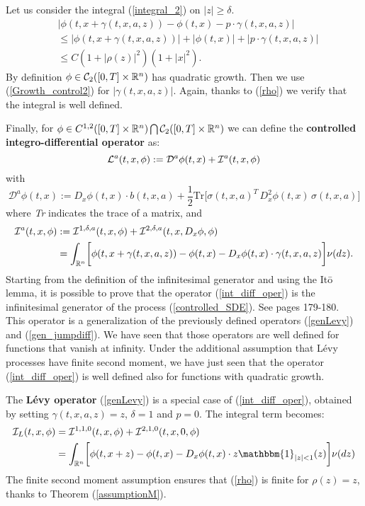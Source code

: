 Let us consider the integral (\ref{integral_2}) on $|z|\geq \delta$. 
\begin{align*}
 & \bigg|\phi(t,x + \gamma(t,x,a,z)) - \phi(t,x) - p \cdot \gamma(t,x,a,z) \bigg| \\ 
 & \leq \big| \phi(t,x + \gamma(t,x,a,z))\big| + \big| \phi(t,x)\big| + \big|p \cdot \gamma(t,x,a,z) \big| \\ 
 & \leq C (1 + |\rho(z)|^2)(1 + |x|^2).
\end{align*}
By definition $\phi \in \mathcal{C}_2([0,T] \times \mathbb{R}^n)$ has quadratic growth.
Then we use (\ref{Growth_control2}) for $|\gamma(t,x,a,z)|$.
Again, thanks to (\ref{rho}) we verify that the integral is well defined.

Finally, for $\phi \in C^{1,2}([0,T] \times \mathbb{R}^n) \bigcap \mathcal{C}_2([0,T] \times \mathbb{R}^n)$ we can define the 
\textbf{controlled integro-differential operator} as:
\begin{equation}\label{int_diff_oper}
 \mathcal{L}^{a}(t,x,\phi) := \mathcal{D}^{a} \phi(t,x) + \mathcal{I}^{a}(t,x,\phi)
\end{equation}
with
\begin{equation}
 \mathcal{D}^{a} \phi(t,x) := D_x \phi(t,x) \cdot b(t,x,a) + \frac{1}{2} \mbox{Tr} \biggl[ \sigma(t,x,a)^T \, D_x^2 \phi(t,x) \, \sigma(t,x,a) \biggr]
\end{equation}
where \emph{Tr} indicates the trace of a matrix, and
\begin{align}\label{int_oper}
 \mathcal{I}^{a}(t,x,\phi) &:= \mathcal{I}^{1,\delta,a}(t,x,\phi) + \mathcal{I}^{2,\delta,a}(t,x,D_x \phi,\phi)\\ \nonumber
 &= \int_{\mathbb{R}^n}
\biggl[ \phi(t,x + \gamma(t,x,a,z)) - \phi(t,x) - D_x \phi(t,x) \cdot \gamma(t,x,a,z) \biggr] \nu(dz). 
\end{align}
Starting from the definition of the infinitesimal generator and using the It\=o lemma, 
it is possible to prove that the operator (\ref{int_diff_oper}) is the infinitesimal generator of the process
(\ref{controlled_SDE}). See \cite{Skorohod} pages 179-180.\\
This operator is a generalization of the previously defined operators (\ref{genLevy}) and (\ref{gen_jumpdiff}).
We have seen that those operators are well defined for functions that vanish at infinity. 
Under the additional assumption that Lévy processes have finite second moment, we have just seen that the operator 
(\ref{int_diff_oper}) is well defined also for functions with quadratic growth.

\noindent
The \textbf{Lévy operator} (\ref{genLevy}) is a special case of (\ref{int_diff_oper}), obtained by setting $\gamma(t,x,a,z) = z$, $\delta = 1$ and $p=0$.
The integral term becomes:
\begin{align*}
\mathcal{I}_L(t,x,\phi) &= \mathcal{I}^{1,1,0}(t,x,\phi) + \mathcal{I}^{2,1,0}(t,x,0,\phi)\\  
                   &= \int_{\R^n} \biggl[ \phi(t,x+ z) - \phi(t,x) - D_x \phi(t,x) \cdot z \mathbbm{1}_{|z|<1}(z) \biggr] \nu(dz) 
\end{align*}
The finite second moment assumption ensures that (\ref{rho}) is finite for $\rho(z) = z$, thanks to Theorem (\ref{assumptionM}).




